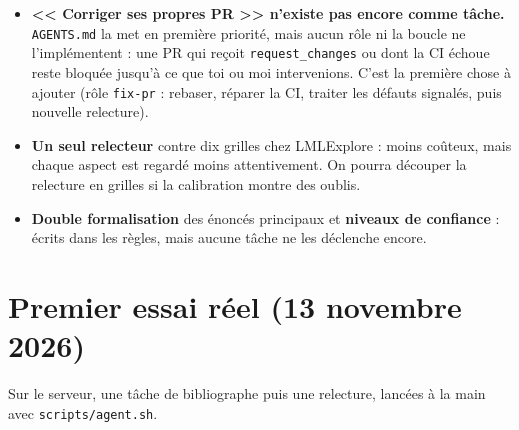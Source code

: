 \documentclass[11pt,a4paper]{article}
\newcommand{\cmd}[1]{\texttt{#1}}
\newcommand{\lmlx}{\textsf{LMLExplore}}
\begin{document}
\begin{manque}
\begin{itemize}
\item \textbf{<< Corriger ses propres PR >> n'existe pas encore comme tâche.} \cmd{AGENTS.md} la met en
  première priorité, mais aucun rôle ni la boucle ne l'implémentent : une PR qui reçoit
  \cmd{request\_changes} ou dont la CI échoue reste bloquée jusqu'à ce que toi ou moi intervenions. C'est
  la première chose à ajouter (rôle \cmd{fix-pr} : rebaser, réparer la CI, traiter les défauts signalés,
  puis nouvelle relecture).
\item \textbf{Un seul relecteur} contre dix grilles chez \lmlx{} : moins coûteux, mais chaque aspect est
  regardé moins attentivement. On pourra découper la relecture en grilles si la calibration montre des
  oublis.
\item \textbf{Double formalisation} des énoncés principaux et \textbf{niveaux de confiance} : écrits dans
  les règles, mais aucune tâche ne les déclenche encore.
\end{itemize}
\end{manque}

\section{Premier essai réel (13 novembre 2026)}

Sur le serveur, une tâche de bibliographe puis une relecture, lancées à la main avec
\cmd{scripts/agent.sh}.
\end{document}
